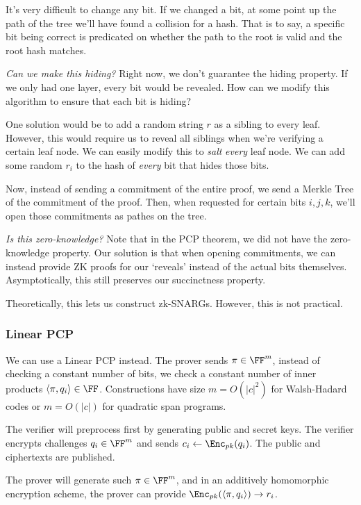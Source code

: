 It's very difficult to change any bit. If we changed a bit, at some point up the path of the tree we'll have found a collision for a hash. That is to say, a specific bit being correct is predicated on whether the path to the root is valid and the root hash matches.

\emph{Can we make this hiding?} Right now, we don't guarantee the hiding property. If we only had one layer, every bit would be revealed. How can we modify this algorithm to ensure that each bit is hiding?

One solution would be to add a random string $r$ as a sibling to every leaf. However, this would require us to reveal all siblings when we're verifying a certain leaf node. We can easily modify this to \emph{salt} \emph{every} leaf node. We can add some random $r_i$ to the hash of \emph{every} bit that hides those bits.

Now, instead of sending a commitment of the entire proof, we send a Merkle Tree of the commitment of the proof. Then, when requested for certain bits $i, j, k$, we'll open those commitments as pathes on the tree.

\emph{Is this zero-knowledge?} Note that in the PCP theorem, we did not have the zero-knowledge property. Our solution is that when opening commitments, we can instead provide ZK proofs for our `reveals' instead of the actual bits themselves. Asymptotically, this still preserves our succinctness property.

Theoretically, this lets us construct zk-SNARGs. However, this is not practical.

\subsubsection{Linear PCP}


We can use a Linear PCP instead. The prover sends $\pi\in\FF^m$, instead of checking a constant number of bits, we check a constant number of inner products $\langle \pi, q_i\rangle\in\FF$. Constructions have size $m = O(|c|^2)$ for Walsh-Hadard codes or $m = O(|c|)$ for quadratic span programs.

The verifier will preprocess first by generating public and secret keys. The verifier encrypts challenges $q_i\in\FF^m$ and sends $c_i\leftarrow \Enc_{pk}(q_i)$. The public and ciphertexts are published.

The prover will generate such $\pi\in\FF^m$, and in an additively homomorphic encryption scheme, the prover can provide $\Enc_{pk}(\langle \pi, q_i\rangle)\rightarrow r_i$.

